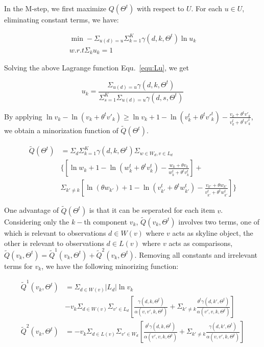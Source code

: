 \documentclass{sig-alternate}
\begin{document}
In the M-step, we first maximize $Q(\Theta^t)$ with respect to $U$. For each $u \in U$, eliminating constant terms, we have:

\begin{align}\label{equ:Lu}
\min -\Sigma_{u(d)=u} \Sigma_{k=1}^K \gamma(d,k,\Theta^t) \ln u_k\\ \nonumber
w.r.t \Sigma_k u_k =1
\end{align}
 
Solving the above Lagrange function Equ.~\ref{equ:Lu}, we get 

\begin{equation}\label{equ:u}
u_k =\frac{\Sigma_{u(d)=u}\gamma(d,k,\Theta^t)}{\Sigma_{s=1}^K \Sigma_{u(d)=u}\gamma(d,s,\Theta^t)}
\end{equation}

By applying $\ln v_k - \ln (v_k + \theta^t v'_k) \geq \ln v_k + 1 - \ln (v_k^t + \theta^t {v'}_k^t) - \frac{v_k + \theta^t v'_k}{v_k^t + \theta^t {v'}_k^t}$, we obtain a minorization function of $\tilde{Q}(\Theta^t)$.

\begin{align}\label{equ:minorization}
\tilde{Q}(\Theta^t) &= \Sigma_d \Sigma_{k=1}^K \gamma(d,k,\Theta^t)  \Sigma_{w\in W_d, v\in L_d} \\\nonumber
& \{ [\ln w_k + 1 - \ln (w_k^t + \theta^t v_k^t) - \frac{w_k+\theta v_k}{w_k^t + \theta^tv_k^t}]+\\\nonumber
&\Sigma_{k'\neq k} [\ln (\theta w_{k'}) + 1 - \ln (v_{k'}^t + \theta^t w_{k'}^t) -  \frac{v_{k'}+\theta w_{k'}}{v_{k'}^t + \theta^tw_{k'}^t}]
\}
\end{align}

One advantage of $\tilde{Q}(\Theta^t)$ is that it can be seperated for each item $v$. Considering only the $k-$th component $v_k$, $\tilde{Q}(v_k,\Theta^t)$ involves two terms, one of which is relevant to observations $d\in W(v)$ where $v$ acts as skyline object, the other is relevant to observations $d \in L(v)$ where $v$ acts as comparisons, $\tilde{Q}(v_k,\Theta^t)=\tilde{Q}^1(v_k,\Theta^t)+\tilde{Q}^2(v_k,\Theta^t)$. Removing all constants and irrelevant terms for $v_k$, we have the following minorizing function:

\begin{align*}%
\tilde{Q}^1(v_k,\Theta^t) & = \Sigma_{d\in W(v)} |L_d| \ln v_k \\\nonumber
& -v_k\Sigma_{d\in W(v)}\Sigma_{v'\in L_d} [\frac{\gamma(d,k,\Theta^t)}{ \alpha(v,v',k,\Theta^t)} +\Sigma_{k'\neq k}\frac{\theta^t\gamma(d,k',\Theta^t)}{\alpha(v',v,k,\Theta^t)}]\\ \nonumber
\tilde{Q}^2(v_k,\Theta^t) & = -v_k \Sigma_{d\in L(v)}\Sigma_{v'\in W_d} [\frac{\theta^t \gamma(d,k,\Theta^t)}{\alpha(v',v,k,\Theta^t)}+\Sigma_{k'\neq k} \frac{\gamma(d,k',\Theta^t)}{\alpha(v,v',k,\Theta^t)}] 
\end{align*}
\end{document}
